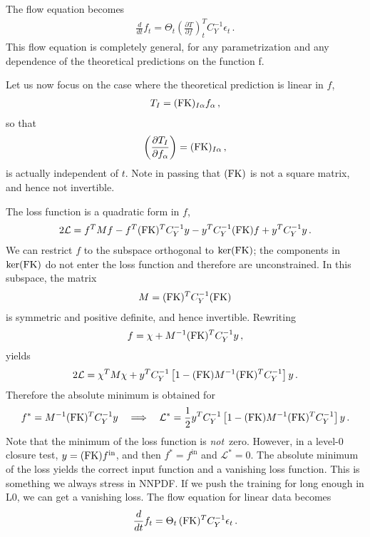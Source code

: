\documentclass[11pt]{article}
\begin{document}
The flow equation becomes
\begin{align}
    \label{eq:FlowWithNTKNoIndices}
    \frac{d}{dt} f_t = 
        \Theta_t \left(\frac{\partial T}{\partial f}\right)_t^T C_Y^{-1} \epsilon_t\, .
\end{align}
This flow equation is completely general, for any parametrization and any dependence of the theoretical predictions on the function f.

Let us now focus on the case where the theoretical prediction is linear in $f$, 
\begin{align}
    \label{eq:LinearDataFK}
    T_I = (\mathrm{FK})_{I\alpha} f_\alpha\, ,
\end{align}
so that 
\begin{align}
    \label{eq:LinearNabla}
    \left(\frac{\partial T_I}{\partial f_\alpha}\right) = (\mathrm{FK})_{I\alpha}\, ,
\end{align}
is actually independent of $t$. Note in passing that $(\mathrm{FK})$ is not a square matrix, and hence not invertible. 

The loss function is a quadratic form in $f$,
\begin{align}
    \label{eq:QuadraticLossInf}
    2 \mathcal{L} = f^T M f - f^T (\mathrm{FK})^T C_Y^{-1} y - y^T C_Y^{-1} (\mathrm{FK}) f + y^T C_Y^{-1} y \, .
\end{align}
We can restrict $f$ to the subspace orthogonal to $\ker(\mathrm{FK})$; the components in $\ker(\mathrm{FK})$ do not 
enter the loss function and therefore are unconstrained. In this subspace, the matrix 
\begin{align}
    \label{eq:MmatrixForLoss}
    M = (\mathrm{FK})^T C_Y^{-1} (\mathrm{FK})
\end{align}
is symmetric and positive definite, and hence invertible. Rewriting 
\begin{align}
    \label{eq:CompleteTheSquare}
    f = \chi + M^{-1} (\mathrm{FK})^T C_Y^{-1} y\, ,
\end{align}
yields
\begin{align}
    \label{eq:LossFunctionOfChi}
    2 \mathcal{L} = \chi^T M \chi +
        y^T C_Y^{-1} \left[
            1 - (\mathrm{FK}) M^{-1} (\mathrm{FK})^T C_Y^{-1}
        \right] y\, .
\end{align}
Therefore the absolute minimum is obtained for 
\begin{align}
    \label{eq:MinimumLossInf}
    f^* = M^{-1} (\mathrm{FK})^T C_Y^{-1} y \quad \Longrightarrow \quad 
        \mathcal{L}^* = \frac12   y^T C_Y^{-1} \left[
            1 - (\mathrm{FK}) M^{-1} (\mathrm{FK})^T C_Y^{-1}
        \right] y\, .  
\end{align}
Note that the minimum of the loss function is {\em not}\ zero. However, in a level-0 closure test, $y = (\mathrm{FK}) f^{\mathrm{in}}$, and then 
$f^* = f^{\mathrm{in}}$ and $\mathcal{L}^*=0$. The absolute minimum of the loss yields the correct input function and a vanishing loss 
function. This is something we always stress in NNPDF. If we push the training for long enough in L0, we can get a vanishing loss. 
The flow equation for linear data becomes
\begin{align}
    \label{eq:FlowLinearDataNTK}
    \frac{d}{dt} f_t = 
        \Theta_t\, (\mathrm{FK})^T C_Y^{-1} \epsilon_t\, .
\end{align}
\end{document}
